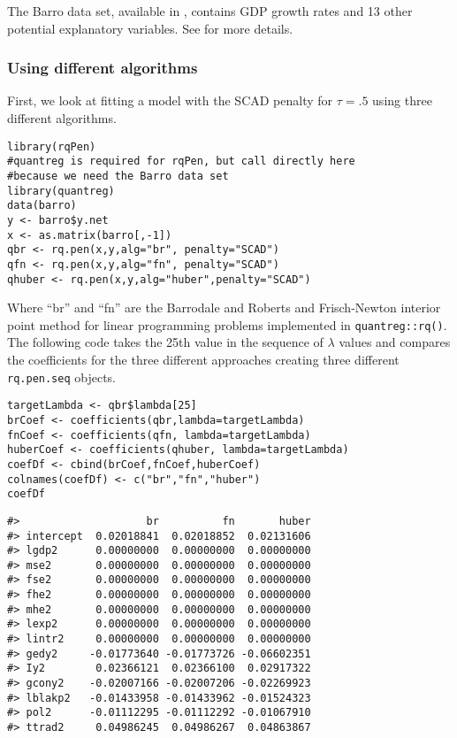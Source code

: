 The Barro data set, available in , contains GDP growth rates and 13 other potential explanatory variables. See \citet{barro} for more details.

\subsubsection{Using different algorithms}\label{using-different-algorithms}

First, we look at fitting a model with the SCAD penalty for \(\tau=.5\) using three different algorithms.

\begin{verbatim}
library(rqPen)
#quantreg is required for rqPen, but call directly here
#because we need the Barro data set
library(quantreg)
data(barro)
y <- barro$y.net
x <- as.matrix(barro[,-1])
qbr <- rq.pen(x,y,alg="br", penalty="SCAD")
qfn <- rq.pen(x,y,alg="fn", penalty="SCAD")
qhuber <- rq.pen(x,y,alg="huber",penalty="SCAD")
\end{verbatim}

Where ``br'' and ``fn'' are the Barrodale and Roberts \citep{crq1, crq2} and Frisch-Newton \citep{portnoy1997} interior point method for linear programming problems implemented in \texttt{quantreg::rq()}. The following code takes the 25th value in the sequence of \(\lambda\) values and compares the coefficients for the three different approaches creating three different \texttt{rq.pen.seq} objects.

\begin{verbatim}
targetLambda <- qbr$lambda[25]
brCoef <- coefficients(qbr,lambda=targetLambda)
fnCoef <- coefficients(qfn, lambda=targetLambda)
huberCoef <- coefficients(qhuber, lambda=targetLambda)
coefDf <- cbind(brCoef,fnCoef,huberCoef)
colnames(coefDf) <- c("br","fn","huber")
coefDf
\end{verbatim}

\begin{verbatim}
#>                    br          fn       huber
#> intercept  0.02018841  0.02018852  0.02131606
#> lgdp2      0.00000000  0.00000000  0.00000000
#> mse2       0.00000000  0.00000000  0.00000000
#> fse2       0.00000000  0.00000000  0.00000000
#> fhe2       0.00000000  0.00000000  0.00000000
#> mhe2       0.00000000  0.00000000  0.00000000
#> lexp2      0.00000000  0.00000000  0.00000000
#> lintr2     0.00000000  0.00000000  0.00000000
#> gedy2     -0.01773640 -0.01773726 -0.06602351
#> Iy2        0.02366121  0.02366100  0.02917322
#> gcony2    -0.02007166 -0.02007206 -0.02269923
#> lblakp2   -0.01433958 -0.01433962 -0.01524323
#> pol2      -0.01112295 -0.01112292 -0.01067910
#> ttrad2     0.04986245  0.04986267  0.04863867
\end{verbatim}

